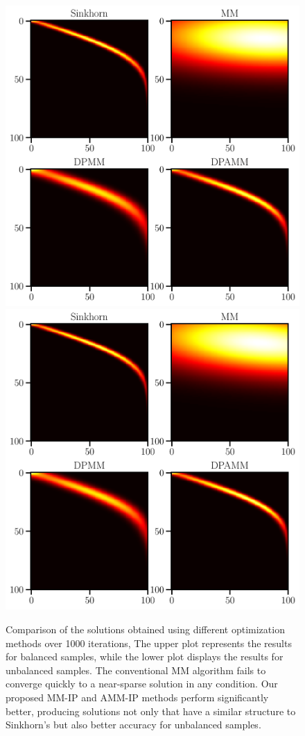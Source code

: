 \documentclass[conference]{IEEEtran}
\begin{document}
\begin{figure}[tp]
\centering
\includegraphics[width = 0.99\linewidth]{pic/ex2}
\centering
\includegraphics[width = 0.99\linewidth]{pic/ex4}
\setlength{\belowcaptionskip}{-30pt}
\caption{Comparison of the solutions obtained using different optimization methods over 1000 iterations, The upper plot represents the results for balanced samples, while the lower plot displays the results for unbalanced samples. The conventional MM algorithm fails to converge quickly to a near-sparse solution in any condition. Our proposed MM-IP and AMM-IP methods perform significantly better, producing solutions not only that have a similar structure to Sinkhorn's but also better accuracy for unbalanced samples.}
\label{Fig:ex2}
\end{figure}
\end{document}
